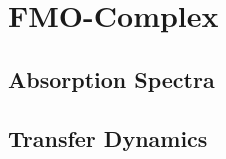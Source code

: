 \section{FMO-Complex}
\label{sec:num.fmo}

\subsection{Absorption Spectra}
\label{sub:num.fmo.absorption}

\subsection{Transfer Dynamics}
\label{sub:num.fmo.dynamics}
